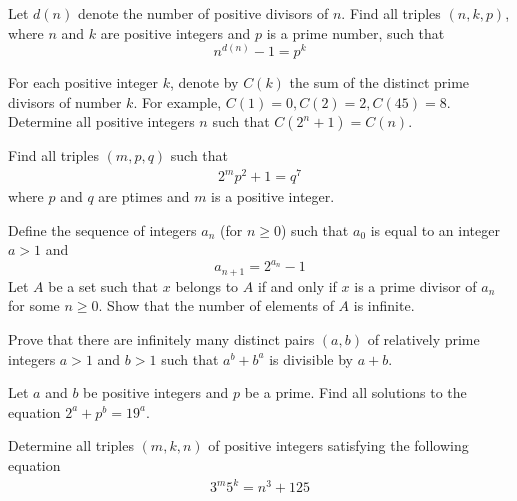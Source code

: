 \begin{problem} %
	Let $d(n)$ denote the number of positive divisors of $n$. Find all triples $(n,k,p)$, where $n$ and $k$ are positive integers and $p$ is a prime number, such that
	\[n^{d(n)} - 1 = p^k\]
\end{problem}

\begin{problem}[IZHO 2017] %
	For each positive integer $k$, denote by $C(k)$ the sum of the distinct prime divisors of number $k$. For example, $C(1)=0,C(2)=2,C(45)=8$. Determine all positive integers $n$ such that $C(2^n+1)=C(n)$.
\end{problem}

\begin{problem} %
	Find all triples $(m,p,q)$ such that
		\begin{align*} 2^mp^2 +1=q^7 \end{align*}
	where $p$ and $q$ are ptimes and $m$ is a positive integer.
\end{problem}

\begin{problem}[Brazil 2016] %
	Define the sequence of integers $a_n$ (for $n \geq 0$) such that $a_0$ is equal to an integer $a>1$ and $$a_{n+1}=2^{a_n}-1$$
	Let $A$ be a set such that $x$ belongs to $A$ if and only if $x$ is a prime divisor of $a_n$ for some $n \geq 0$. Show that the number of elements of $A$ is infinite.
\end{problem}

\begin{problem}[USAMO‌2017] %
	Prove that there are infinitely many distinct pairs $(a, b)$ of relatively prime integers $a>1$ and $b>1$ such that $a^b+b^a$ is divisible by $a+b$.
\end{problem}

\begin{problem} %
	Let $a$ and $b$ be positive integers and $p$ be a prime. Find all solutions to the equation $2^a+p^b=19^a$.
\end{problem}

\begin{problem} %
	Determine all triples $(m,k,n)$ of positive integers satisfying the following equation
		\begin{align*}
			3^m5^k=n^3+125
		\end{align*}
\end{problem}

